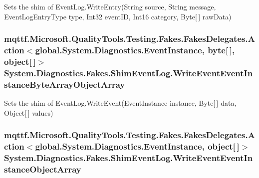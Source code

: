 Sets the shim of Event\-Log.\-Write\-Entry(\-String source, String message, Event\-Log\-Entry\-Type type, Int32 event\-I\-D, Int16 category, Byte\mbox{[}$\,$\mbox{]} raw\-Data)

\hypertarget{class_system_1_1_diagnostics_1_1_fakes_1_1_shim_event_log_ae82a6befe22f94cb6079f5b540b7d8a1}{
\subsubsection[{Write\-Event\-Event\-Instance\-Byte\-Array\-Object\-Array}]{\setlength{\rightskip}{0pt plus 5cm}mqttf.\-Microsoft.\-Quality\-Tools.\-Testing.\-Fakes.\-Fakes\-Delegates.\-Action$<$global.\-System.\-Diagnostics.\-Event\-Instance, byte\mbox{[}$\,$\mbox{]}, object\mbox{[}$\,$\mbox{]}$>$ System.\-Diagnostics.\-Fakes.\-Shim\-Event\-Log.\-Write\-Event\-Event\-Instance\-Byte\-Array\-Object\-Array\hspace{0.3cm}{\ttfamily [set]}}}\label{class_system_1_1_diagnostics_1_1_fakes_1_1_shim_event_log_ae82a6befe22f94cb6079f5b540b7d8a1}


Sets the shim of Event\-Log.\-Write\-Event(\-Event\-Instance instance, Byte\mbox{[}$\,$\mbox{]} data, Object\mbox{[}$\,$\mbox{]} values)

\hypertarget{class_system_1_1_diagnostics_1_1_fakes_1_1_shim_event_log_aefdf35f7063e20903ae8000cdd12448c}{
\subsubsection[{Write\-Event\-Event\-Instance\-Object\-Array}]{\setlength{\rightskip}{0pt plus 5cm}mqttf.\-Microsoft.\-Quality\-Tools.\-Testing.\-Fakes.\-Fakes\-Delegates.\-Action$<$global.\-System.\-Diagnostics.\-Event\-Instance, object\mbox{[}$\,$\mbox{]}$>$ System.\-Diagnostics.\-Fakes.\-Shim\-Event\-Log.\-Write\-Event\-Event\-Instance\-Object\-Array\hspace{0.3cm}{\ttfamily [set]}}}\label{class_system_1_1_diagnostics_1_1_fakes_1_1_shim_event_log_aefdf35f7063e20903ae8000cdd12448c}


